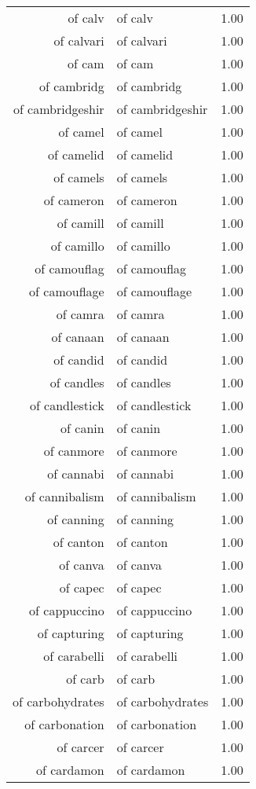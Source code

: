 \begin{table}[ht]
\begin{tabular}{rlr}
  of calv & of calv & 1.00 \\ 
  of calvari & of calvari & 1.00 \\ 
  of cam & of cam & 1.00 \\ 
  of cambridg & of cambridg & 1.00 \\ 
  of cambridgeshir & of cambridgeshir & 1.00 \\ 
  of camel & of camel & 1.00 \\ 
  of camelid & of camelid & 1.00 \\ 
  of camels & of camels & 1.00 \\ 
  of cameron & of cameron & 1.00 \\ 
  of camill & of camill & 1.00 \\ 
  of camillo & of camillo & 1.00 \\ 
  of camouflag & of camouflag & 1.00 \\ 
  of camouflage & of camouflage & 1.00 \\ 
  of camra & of camra & 1.00 \\ 
  of canaan & of canaan & 1.00 \\ 
  of candid & of candid & 1.00 \\ 
  of candles & of candles & 1.00 \\ 
  of candlestick & of candlestick & 1.00 \\ 
  of canin & of canin & 1.00 \\ 
  of canmore & of canmore & 1.00 \\ 
  of cannabi & of cannabi & 1.00 \\ 
  of cannibalism & of cannibalism & 1.00 \\ 
  of canning & of canning & 1.00 \\ 
  of canton & of canton & 1.00 \\ 
  of canva & of canva & 1.00 \\ 
  of capec & of capec & 1.00 \\ 
  of cappuccino & of cappuccino & 1.00 \\ 
  of capturing & of capturing & 1.00 \\ 
  of carabelli & of carabelli & 1.00 \\ 
  of carb & of carb & 1.00 \\ 
  of carbohydrates & of carbohydrates & 1.00 \\ 
  of carbonation & of carbonation & 1.00 \\ 
  of carcer & of carcer & 1.00 \\ 
  of cardamon & of cardamon & 1.00 \\ 

\end{tabular}
\end{table}
